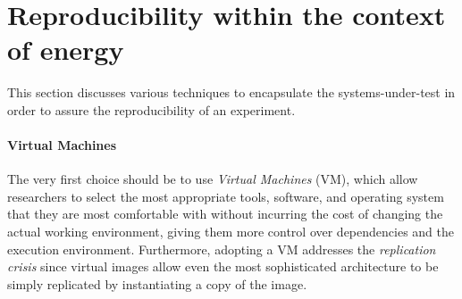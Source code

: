 




\section{Reproducibility within the context of energy}\label{sec:benchmarking_reproducibility}
This section discusses various techniques to encapsulate the systems-under-test in order to assure the reproducibility of an experiment.

\paragraph{Virtual Machines}
The very first choice should be to use \emph{Virtual Machines} (VM), which allow researchers to select the most appropriate tools, software, and operating system that they are most comfortable with without incurring the cost of changing the actual working environment, giving them more control over dependencies and the execution environment.
Furthermore, adopting a VM addresses the \emph{replication crisis} since virtual images allow even the most sophisticated architecture to be simply replicated by instantiating a copy of the image.

